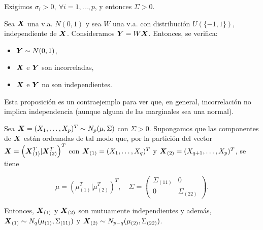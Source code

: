  \begin{nota}
Exigimos $\sigma_i > 0, \ \forall i = 1,\dots, p$, y entonces $\Sigma > 0$.
  \end{nota}

  \begin{nprop}
    Sea $\boldsymbol{X}$ una v.a. $N(0,1)$ y sea $W$ una v.a. con distribución $U(\{-1,1\})$, independiente de $\boldsymbol{X}$. Consideramos $\boldsymbol{Y} = W\boldsymbol{X}$. Entonces, se verifica:
    \begin{itemize}
    \item $\boldsymbol{Y} \sim N(0,1)$,
    \item $\boldsymbol{X}$ e $\boldsymbol{Y}$ son incorreladas,
      \item $\boldsymbol{X}$ e $\boldsymbol{Y}$ no son independientes. 
    \end{itemize}

  \end{nprop}
  Esta proposición es un contraejemplo para ver que, en general, incorrelación no implica independencia (aunque alguna de las marginales sea una normal).

  \begin{nth} \label{independenciacovbloques}
    Sea $\boldsymbol{X} = (X_1, \dots ,X_p)^T \sim N_p(\mu,\Sigma)$ con $\Sigma > 0$. Supongamos que las componentes de $\boldsymbol{X}$ están ordenadas de tal modo que, por la partición del vector $\boldsymbol{X} = \left(\boldsymbol{X}_{(1)}^T | \boldsymbol{X}_{(2)}^T\right)^T$ con $\boldsymbol{X}_{(1)} = (X_1,\dots,X_q)^T$ y $\boldsymbol{X}_{(2)} = (X_{q+1},\dots,X_p)^T$, se tiene
    
    \[
    \mu = \left(\mu_{(1)}^T | \mu_{(2)}^T\right)^T, \quad \Sigma = \begin{pmatrix} \Sigma_{(11)} & 0 \\ 0 & \Sigma_{(22)} \end{pmatrix}
    .\]
    
    Entonces, $\boldsymbol{X}_{(1)}$ y $\boldsymbol{X}_{(2)}$ son mutuamente independientes y además, $\boldsymbol{X}_{(1)} \sim N_q(\mu_{(1)}, \Sigma_{(11)})$ y $\boldsymbol{X}_{(2)} \sim N_{p-q}(\mu_{(2)}, \Sigma_{(22)})$.
  \end{nth}

